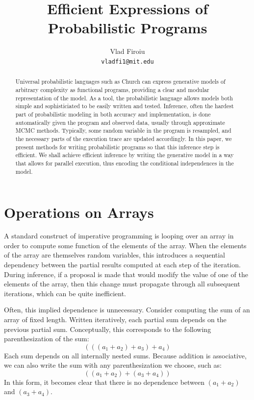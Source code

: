 \documentclass[11pt]{article}
\title{Efficient Expressions of Probabilistic Programs}
\author{Vlad Firoiu \\ \texttt{vladfi1@mit.edu}}
\begin{document}
\maketitle

\begin{abstract}
Universal probabilistic languages such as Church \cite{Church} can express generative models of arbitrary complexity as functional programs, providing a clear and modular representation of the model. As a tool, the probabilistic language allows models both simple and sophisticiated to be easily written and tested. Inference, often the hardest part of probabilistic modeling in both accuracy and implementation, is done automatically given the program and observed data, usually through approximate MCMC methods. Typically, some random variable in the program is resampled, and the necessary parts of the execution trace are updated accordingly. In this paper, we present methods for writing probabilistic programs so that this inference step is efficient. We shall achieve efficient inference by writing the generative model in a way that allows for parallel execution, thus encoding the conditional independences in the model.
\end{abstract}

\tableofcontents

\section{Operations on Arrays}

A standard construct of imperative programming is looping over an array in order to compute some function of the elements of the array. When the elements of the array are themselves random variables, this introduces a sequential dependency between the partial results computed at each step of the iteration. During inference, if a proposal is made that would modify the value of one of the elements of the array, then this change must propagate through all subsequent iterations, which can be quite inefficient.

Often, this implied dependence is unnecessary. Consider computing the sum of an array of fixed length. Written iteratively, each partial sum depends on the previous partial sum. Conceptually, this corresponds to the following parenthesization of the sum:
\[
(((a_1 + a_2) + a_3) + a_4)
\]
Each sum depends on all internally nested sums. Because addition is associative, we can also write the sum with any parenthesization we choose, such as:
\[
((a_1 + a_2) + (a_3 + a_4))
\]
In this form, it becomes clear that there is no dependence between $(a_1+a_2)$ and $(a_3+a_4)$.
\end{document}
